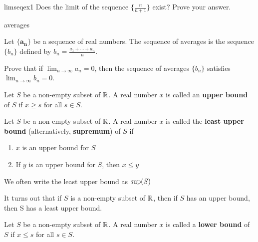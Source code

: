 \begin{problem}{limseqex1}
Does the limit of the sequence $\{\frac{n}{n+1}\}$ exist?  Prove your answer.
\end{problem}



\begin{problem}{averages}

Let $\{\bm{a_n}\}$ be a sequence of real numbers.  The sequence of averages is the sequence $\{b_n\}$ defined by $b_n = \frac{a_1 + \cdots + a_n}{n}$.

Prove that if $\lim_{n \to \infty} a_n = 0$, then the sequence of averages $\{b_n\}$ satisfies $\lim_{n \to \infty} b_n = 0$.

\end{problem}

\begin{definition}
Let $S$ be a non-empty subset of $\mathbb{R}$.  A real number $x$ is called an \textbf{upper bound} of $S$ if $x \geq s$ for all $s \in S$.
\end{definition}

\begin{definition}
Let $S$ be a non-empty subset of $\mathbb{R}$.  A real number $x$ is called the \textbf{least upper bound} (alternatively, \textbf{supremum}) of $S$ if
\begin{enumerate}
    \item $x$ is an upper bound for $S$
    \item If $y$ is an upper bound for $S$, then $x \leq y$
\end{enumerate}

We often write the least upper bound as $\textnormal{sup}(S)$
\end{definition}

It turns out that if $S$ is a non-empty subset of $\mathbb{R}$, then if $S$ has an upper bound, then S has a least upper bound.

\begin{definition}
Let $S$ be a non-empty subset of $\mathbb{R}$.  A real number $x$ is called a \textbf{lower bound} of $S$ if $x \leq s$ for all $s \in S$.
\end{definition}

